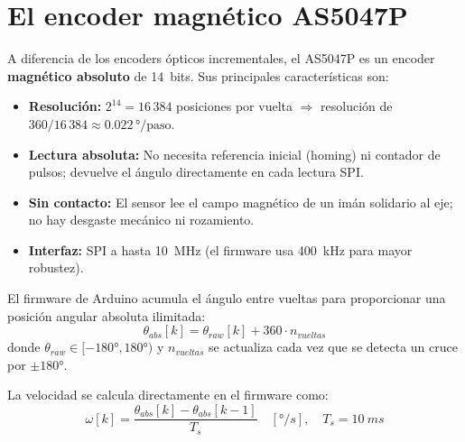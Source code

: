 \documentclass[12pt,a4paper]{article}
\begin{document}
\appendix
\section{El encoder magnético AS5047P}

A diferencia de los encoders ópticos incrementales, el AS5047P es un encoder
\textbf{magnético absoluto} de 14~bits. Sus principales características son:

\begin{itemize}[noitemsep]
  \item \textbf{Resolución:} $2^{14} = 16\,384$ posiciones por vuelta
        $\Rightarrow$ resolución de $360/16\,384 \approx 0.022\,°/\text{paso}$.
  \item \textbf{Lectura absoluta:} No necesita referencia inicial (homing) ni
        contador de pulsos; devuelve el ángulo directamente en cada lectura SPI.
  \item \textbf{Sin contacto:} El sensor lee el campo magnético de un imán
        solidario al eje; no hay desgaste mecánico ni rozamiento.
  \item \textbf{Interfaz:} SPI a hasta 10~MHz (el firmware usa 400~kHz para
        mayor robustez).
\end{itemize}

El firmware de Arduino acumula el ángulo entre vueltas para proporcionar una
posición angular absoluta ilimitada:
\begin{equation}
  \theta_{abs}[k] = \theta_{raw}[k] + 360 \cdot n_{vueltas}
\end{equation}
donde $\theta_{raw}\in[-180°,180°)$ y $n_{vueltas}$ se actualiza cada vez que
se detecta un cruce por $\pm 180°$.

La velocidad se calcula directamente en el firmware como:
\begin{equation}
  \omega[k] = \frac{\theta_{abs}[k] - \theta_{abs}[k-1]}{T_s}
  \quad [\si{\degree/s}], \quad T_s = \SI{10}{ms}
\end{equation}
\end{document}
